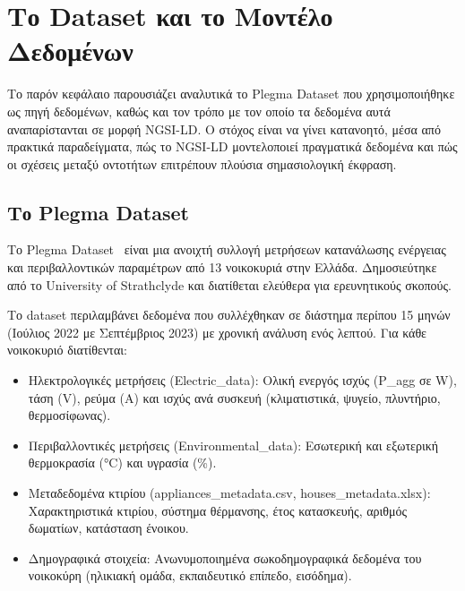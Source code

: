 \chapter{Το \textlatin{Dataset} και το Μοντέλο Δεδομένων}
\label{ch:dataset}

Το παρόν κεφάλαιο παρουσιάζει αναλυτικά το \textlatin{Plegma Dataset} που
χρησιμοποιήθηκε ως πηγή δεδομένων, καθώς
και τον τρόπο με τον οποίο τα δεδομένα αυτά αναπαρίστανται σε μορφή
\textlatin{NGSI-LD}. Ο στόχος είναι να γίνει κατανοητό, μέσα από πρακτικά
παραδείγματα, πώς το \textlatin{NGSI-LD} μοντελοποιεί πραγματικά δεδομένα
και πώς οι σχέσεις μεταξύ οντοτήτων επιτρέπουν πλούσια σημασιολογική
έκφραση.

\section{Το \textlatin{Plegma Dataset}}
\label{sec:plegma-dataset}

Το \textlatin{Plegma Dataset}~\cite{plegma2024} είναι μια ανοιχτή συλλογή
μετρήσεων κατανάλωσης ενέργειας και περιβαλλοντικών παραμέτρων από 13
νοικοκυριά στην Ελλάδα. Δημοσιεύτηκε από το \textlatin{University of
Strathclyde} και διατίθεται ελεύθερα για ερευνητικούς σκοπούς.

Το \textlatin{dataset} περιλαμβάνει δεδομένα που συλλέχθηκαν σε διάστημα
περίπου 15 μηνών (Ιούλιος 2022 με Σεπτέμβριος 2023) με χρονική ανάλυση ενός
λεπτού. Για κάθε νοικοκυριό διατίθενται:

\begin{itemize}
    \item Ηλεκτρολογικές μετρήσεις (\textlatin{Electric\_data}): Ολική
    ενεργός ισχύς (\textlatin{P\_agg} σε \textlatin{W}), τάση (\textlatin{V}),
    ρεύμα (\textlatin{A}) και ισχύς ανά συσκευή (κλιματιστικά, ψυγείο,
    πλυντήριο, θερμοσίφωνας).
    \item Περιβαλλοντικές μετρήσεις (\textlatin{Environmental\_data}):
    Εσωτερική και εξωτερική θερμοκρασία (°\textlatin{C}) και υγρασία (\%).
    \item Μεταδεδομένα κτιρίου (\textlatin{appliances\_metadata.csv},
    \textlatin{houses\_metadata.xlsx}): Χαρακτηριστικά κτιρίου, σύστημα θέρμανσης,
    έτος κατασκευής, αριθμός δωματίων, κατάσταση ένοικου.
    \item Δημογραφικά στοιχεία: Ανωνυμοποιημένα σωκοδημογραφικά
    δεδομένα του νοικοκύρη (ηλικιακή ομάδα, εκπαιδευτικό επίπεδο, εισόδημα).
\end{itemize}

